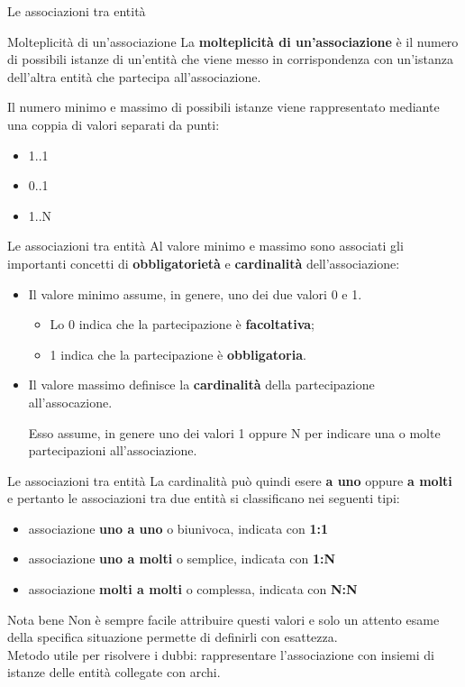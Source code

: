 %
\begin{frame}{Le associazioni tra entit\`a}
\begin{block}{Molteplicit\`a di un'associazione}
La \textbf{molteplicit\`a di un'associazione} \`e il numero di possibili istanze di un'entit\`a che viene messo in corrispondenza con un'istanza dell'altra entit\`a che partecipa all'associazione.
\end{block}
\pause
Il numero minimo e massimo di possibili istanze viene rappresentato mediante una coppia di valori separati da punti: 
\begin{itemize}
    \item 1..1
    \item 0..1
    \item 1..N
\end{itemize}
\end{frame}
%
\begin{frame}{Le associazioni tra entit\`a}
Al valore minimo e massimo sono associati gli importanti concetti di \textbf{obbligatoriet\`a} e \textbf{cardinalit\`a} dell'associazione:
\begin{itemize}[<+->]
    \item Il valore minimo assume, in genere, uno dei due valori 0 e 1.
    \begin{itemize}
        \item Lo 0 indica che la partecipazione \`e \textbf{facoltativa};
        \item 1 indica che la partecipazione \`e \textbf{obbligatoria}.
    \end{itemize}
    \item Il valore massimo definisce la \textbf{cardinalit\`a} della partecipazione all'assocazione.
    
    Esso assume, in genere uno dei valori 1 oppure N per indicare una o molte partecipazioni all'associazione.
\end{itemize}
\end{frame}
%
\begin{frame}{Le associazioni tra entit\`a}
\vspace{.5cm}
La cardinalit\`a pu\`o quindi esere \textbf{a uno} oppure \textbf{a molti} e pertanto le associazioni tra due entit\`a si classificano nei seguenti tipi:
\begin{itemize}[<+->]
    \item associazione \textbf{uno a uno} o biunivoca, indicata con \textbf{1:1}
    \item associazione \textbf{uno a molti} o semplice, indicata con \textbf{1:N}
    \item associazione \textbf{molti a molti} o complessa, indicata con \textbf{N:N}
\end{itemize}
\begin{block}{Nota bene}
Non \`e sempre facile attribuire questi valori e solo un attento esame della specifica situazione permette di definirli con esattezza.
\pause
\newline
\\Metodo utile per risolvere i dubbi: rappresentare l'associazione con insiemi di istanze delle entit\`a collegate con archi.
\end{block}
\end{frame}

